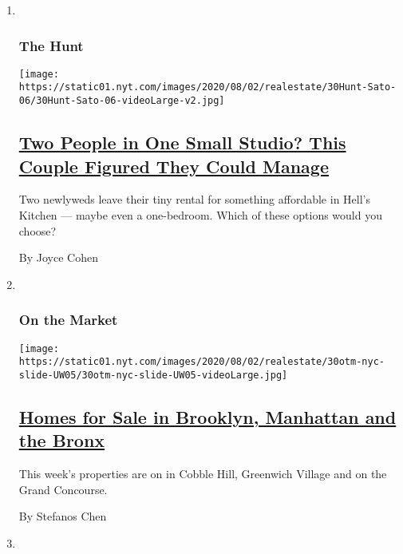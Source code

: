 \begin{enumerate}
\def\labelenumi{\arabic{enumi}.}
\item ~
  \hypertarget{the-hunt}{%
  \subsubsection{The Hunt}\label{the-hunt}}

  \texttt{[image: https://static01.nyt.com/images/2020/08/02/realestate/30Hunt-Sato-06/30Hunt-Sato-06-videoLarge-v2.jpg]}

  \hypertarget{two-people-in-one-small-studio-this-couple-figured-they-could-manage}{%
  \subsection{\texorpdfstring{\href{/interactive/2020/07/30/realestate/30hunt-sato.html}{Two
  People in One Small Studio? This Couple Figured They Could
  Manage}}{Two People in One Small Studio? This Couple Figured They Could Manage}}\label{two-people-in-one-small-studio-this-couple-figured-they-could-manage}}

  Two newlyweds leave their tiny rental for something affordable in
  Hell's Kitchen --- maybe even a one-bedroom. Which of these options
  would you choose?

  By Joyce Cohen
\item ~
  \hypertarget{on-the-market}{%
  \subsubsection{On the Market}\label{on-the-market}}

  \texttt{[image: https://static01.nyt.com/images/2020/08/02/realestate/30otm-nyc-slide-UW05/30otm-nyc-slide-UW05-videoLarge.jpg]}

  \hypertarget{homes-for-sale-in-brooklyn-manhattan-and-the-bronx}{%
  \subsection{\texorpdfstring{\href{/2020/07/30/realestate/homes-for-sale-in-brooklyn-manhattan-and-the-bronx.html}{Homes
  for Sale in Brooklyn, Manhattan and the
  Bronx}}{Homes for Sale in Brooklyn, Manhattan and the Bronx}}\label{homes-for-sale-in-brooklyn-manhattan-and-the-bronx}}

  This week's properties are on in Cobble Hill, Greenwich Village and on
  the Grand Concourse.

  By Stefanos Chen
\item ~
  \hypertarget{economic-view}{%
}
\end{enumerate}

